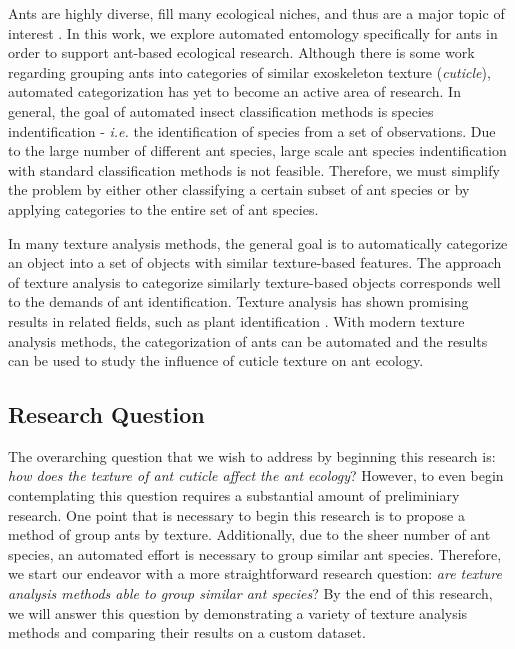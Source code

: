 \documentclass[12pt]{article}
\begin{document}
Ants are highly diverse, fill many ecological niches, and thus are a major topic
of interest \cite{sosiak_multidimensional_2021}. In this work, we explore
automated entomology specifically for ants in order to support ant-based
ecological research. Although there is some work regarding grouping ants into
categories of similar exoskeleton texture (\textit{cuticle}), automated
categorization has yet to become an active area of research. In general, the
goal of automated insect classification methods is species indentification -
\textit{i.e.} the identification of species from a set of observations. Due to
the large number of different ant species, large scale ant species
indentification with standard classification methods is not feasible. Therefore,
we must simplify the problem by either other classifying a certain subset of ant
species or by applying categories to the entire set of ant species.

In many texture analysis methods, the general goal is to automatically
categorize an object into a set of objects with similar texture-based features.
The approach of texture analysis to categorize similarly texture-based objects
corresponds well to the demands of ant identification. Texture analysis has
shown promising results in related fields, such as plant identification
\cite{boudra_plant_2018}. With modern texture analysis methods, the
categorization of ants can be automated and the results can be used to study the
influence of cuticle texture on ant ecology.

\subsection{Research Question}

The overarching question that we wish to address by beginning this research is:
\textit{how does the texture of ant cuticle affect the ant ecology}? However, to
even begin contemplating this question requires a substantial amount of
preliminiary research. One point that is necessary to begin this research is to
propose a method of group ants by texture. Additionally, due to the sheer number
of ant species, an automated effort is necessary to group similar ant species.
Therefore, we start our endeavor with a more straightforward research question:
\textit{are texture analysis methods able to group similar ant species}? By the
end of this research, we will answer this question by demonstrating a variety of
texture analysis methods and comparing their results on a custom dataset.
\end{document}
